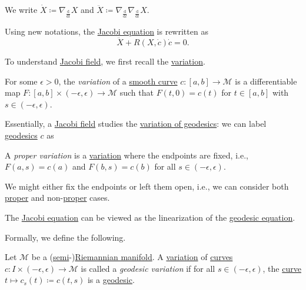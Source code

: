 \begin{notation}
	We write \(\dot{X} \coloneqq \nabla _{\frac{\mathrm{d}}{\mathrm{d}t} }X\) and \(\ddot{X} \coloneqq \nabla _{\frac{\mathrm{d}}{\mathrm{d}t} } \nabla _{\frac{\mathrm{d}}{\mathrm{d}t} } X\).
\end{notation}

Using new notations, the \hyperref[eq:Jacobi]{Jacobi equation} is rewritten as
\[
	\ddot{X} + R (X, \dot{c} ) \dot{c} = 0.
\]

To understand \hyperref[def:Jacobi-field]{Jacobi field}, we first recall the \hyperref[prev:variation]{variation}.

\begin{prev}[Variation]\label{prev:variation}
	For some \(\epsilon > 0\), the \emph{variation} of a \hyperref[def:curve]{smooth curve} \(c\colon [a, b] \to \mathcal{M} \) is a differentiable map \(F\colon [a, b] \times (-\epsilon , \epsilon ) \to \mathcal{M}\) such that \(F(t, 0) = c(t)\) for \(t\in [a, b]\) with \(s\in (-\epsilon , \epsilon )\).
\end{prev}

Essentially, a \hyperref[def:Jacobi-field]{Jacobi field} studies the \hyperref[def:geodesic-variation]{variation of geodesics}: we can label \hyperref[def:geodesic]{geodesics} \(c\) as
\begin{center}
\end{center}

\begin{notation}\label{not:proper-variation}
	A \emph{proper variation} is a \hyperref[prev:variation]{variation} where the endpoints are fixed, i.e., \(F(a, s) = c(a)\) and \(F(b, s)=c(b)\) for all \(s\in (-\epsilon , \epsilon )\).
\end{notation}

\begin{note}
	We might either fix the endpoints or left them open, i.e., we can consider both \hyperref[not:proper-variation]{proper} and non-\hyperref[not:proper-variation]{proper} cases.
\end{note}

\begin{intuition}\label{int:Jacobi-equation}
	The \hyperref[eq:Jacobi]{Jacobi equation} can be viewed as the linearization of the \hyperref[eq:geodesic]{geodesic equation}.
\end{intuition}

Formally, we define the following.

\begin{definition}\label{def:geodesic-variation}
	Let \(\mathcal{M} \) be a (\hyperref[def:pseudo-Riemannian-metric]{semi}-)\hyperref[def:Riemannian-manifold]{Riemannian manifold}. A \hyperref[prev:variation]{variation} of \hyperref[def:curve]{curves} \(c\colon I \times (-\epsilon , \epsilon ) \to \mathcal{M} \) is called a \emph{geodesic variation} if for all \(s\in (-\epsilon , \epsilon )\), the \hyperref[def:curve]{curve} \(t\mapsto c_s(t) \coloneqq c(t, s)\) is a \hyperref[def:geodesic]{geodesic}.
\end{definition}

